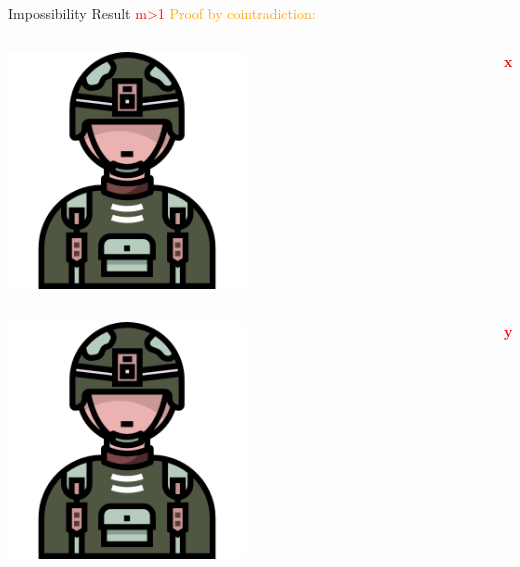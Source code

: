 \documentclass{beamer}
\begin{document}
\begin{frame}{Impossibility Result \textcolor{red}{m>1}}
\textcolor{orange}{Proof by cointradiction:}

\begin{columns}[c] %
    \begin{column}{0.3\textwidth} %
        \includegraphics[width=0.5\textwidth]{images2/soldier (1).png} %
    \end{column}
    \begin{column}{0.7\textwidth} %
        \textbf{\textcolor{red}{x}}
    \end{column}
\end{columns}

\vspace{0.5cm} %

\begin{columns}[c] %
    \begin{column}{0.3\textwidth} %
        \includegraphics[width=0.5\textwidth]{images2/soldier (1).png} %
    \end{column}
    \begin{column}{0.7\textwidth} %
        \textbf{\textcolor{red}{y}}
    \end{column}
\end{columns}


\end{frame}
\end{document}
